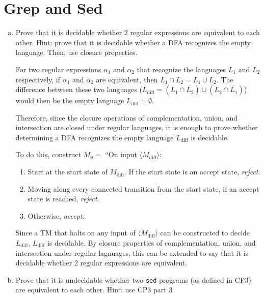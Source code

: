 \documentclass{article}
\begin{document}
    \section{Grep and Sed} 

    \begin{enumerate}[(a)]
        \item Prove that it is decidable whether 2 regular expressions are equivalent to each other. Hint: prove that it is decidable whether a DFA recognizes the empty language. Then, use closure properties.

            For two regular expressions $\alpha_1$ and $\alpha_2$ that recognize the languages $L_1$ and $L_2$ respectively, if $\alpha_1$ and $\alpha_2$ are equivalent, then $L_1 \cap L_2 = L_1 \cup L_2$. The difference between these two languages ($L_\text{diff} = (L_1 \cap \overline{L_2}) \cup (L_2 \cap \overline{L_1})$) would then be the empty language $L_\text{diff} = \emptyset$.

            Therefore, since the closure operations of complementation, union, and intersection are closed under regular languages, it is enough to prove whether determining a DFA recognizes the empty language $L_\text{diff}$ is decidable.

            To do this, construct $M_\emptyset = $ ``On input $\langle M_\text{diff} \rangle$:
            \begin{enumerate}[1.]
                \item Start at the start state of $M_\text{diff}$. If the start state is an accept state, \textit{reject}.

                \item Moving along every connected transition from the start state, if an accept state is reached, \textit{reject}.

                \item Otherwise, \textit{accept}.
            \end{enumerate}

            Since a TM that halts on any input of $\langle M_\text{diff} \rangle$ can be constructed to decide $L_\text{diff}$, $L_\text{diff}$ is decidable. By closure properties of complementation, union, and intersection under regular lagnuages, this can be extended to say that it is decidable whether 2 regular expressions are equivalent.

        \item Prove that it is undecidable whether two \texttt{sed} programs (as defined in CP3) are equivalent to each other. Hint: use CP3 part 3


\end{enumerate}
\end{document}

